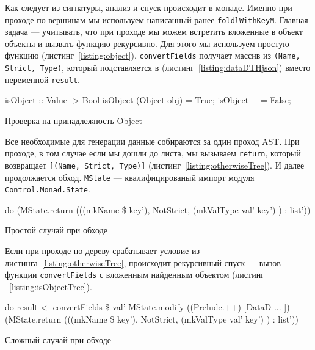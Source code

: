 Как следует из сигнатуры, анализ и спуск происходит в монаде. Именно при проходе по вершинам мы используем написанный ранее \lstinline{foldlWithKeyM}. Главная задача --- учитывать, что при проходе мы можем встретить вложенные в объект объекты и вызвать функцию рекурсивно. Для этого мы используем простую функцию (листинг~\ref{listing:object}). \lstinline{convertFields} получает массив из \lstinline{(Name, Strict, Type)}, который подставляется в (листинг~\ref{listing:dataDTHjson}) вместо переменной \lstinline{result}.

\begin{ListingEnv}[H]
\begin{Verb}
isObject :: Value -> Bool
isObject (Object obj) = True;
isObject _ = False;
\end{Verb}
\caption{Проверка на принадлежность Object}
\label{listing:object}
\end{ListingEnv} 

Все необходимые для генерации данные собираются за один проход AST. При проходе, в том случае если мы дошли до листа, мы вызываем \lstinline{return}, который возвращает \lstinline{[(Name, Strict, Type)]} (листинг~\ref{listing:otherwiseTree}). И далее продолжается обход. \lstinline{MState} --- квалифицированый импорт модуля \lstinline{Control.Monad.State}.

\begin{ListingEnv}[H]
\begin{Verb}
do
      (MState.return (((mkName \$  key'), NotStrict,
                                (mkValType val' key') ) : list'))
\end{Verb}
\caption{Простой случай при обходе}
\label{listing:otherwiseTree}
\end{ListingEnv} 

Если при проходе по дереву срабатывает условие из листинга~\ref{listing:otherwiseTree}, происходит рекурсивный спуск --- вызов функции \lstinline{convertFields} с вложенным найденным объектом (листинг ~\ref{listing:isObjectTree}).

\begin{ListingEnv}[H]
\begin{Verb}
do
      result <- convertFields \$ val'
      MState.modify ((Prelude.++) [DataD ... ])
      (MState.return (((mkName \$  key'), NotStrict,
                                (mkValType val' key') ) : list'))
\end{Verb}
\caption{Сложный случай при обходе}
\label{listing:isObjectTree}
\end{ListingEnv} 

